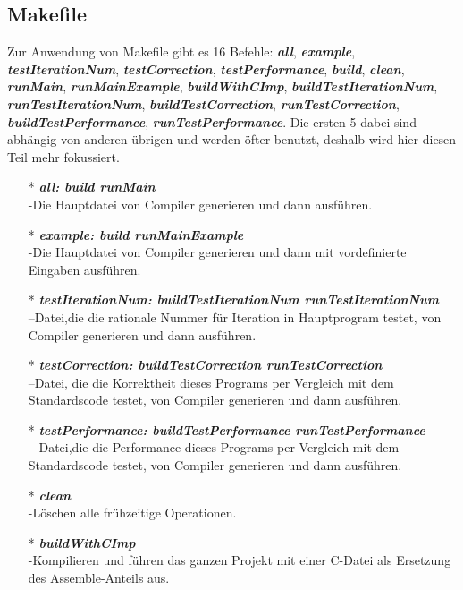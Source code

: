 \documentclass[course=erap]{aspdoc}
\begin{document}
\subsection{Makefile}
Zur Anwendung von Makefile gibt es 16 Befehle: \textbf{\emph{all}}, \textbf{\emph{example}}, \textbf{\emph{testIterationNum}}, \textbf{\emph{testCorrection}}, \textbf{\emph{testPerformance}}, \textbf{\emph{build}}, \textbf{\emph{clean}}, \textbf{\emph{runMain}}, \textbf{\emph{runMainExample}}, \textbf{\emph{buildWithCImp}}, \textbf{\emph{buildTestIterationNum}}, \textbf{\emph{runTestIterationNum}}, \textbf{\emph{buildTestCorrection}}, \textbf{\emph{runTestCorrection}}, \textbf{\emph{buildTestPerformance}}, \textbf{\emph{runTestPerformance}}. Die ersten 5 dabei sind abhängig von anderen übrigen und werden öfter benutzt, deshalb wird hier diesen Teil mehr fokussiert.
\begin{itemize}
\item[*]\textbf{\emph{all: build runMain}}
\\-Die Hauptdatei von Compiler generieren und dann ausführen.
\item[*]\emph{\textbf{example: build runMainExample }}
\\-Die Hauptdatei von Compiler generieren und dann mit vordefinierte Eingaben ausführen.
\item[*]\textbf{\emph{testIterationNum: buildTestIterationNum runTestIterationNum}}
\\–Datei,die die rationale Nummer für Iteration in Hauptprogram testet, von Compiler generieren und dann ausführen.
\item[*]\emph{\textbf{testCorrection: buildTestCorrection runTestCorrection }}
\\–Datei, die die Korrektheit dieses Programs per Vergleich mit dem Standardscode testet, von Compiler generieren und dann ausführen.
\item[*]\textbf{\emph{testPerformance: buildTestPerformance runTestPerformance }}
\\– Datei,die die Performance dieses Programs per Vergleich mit dem Standardscode testet, von Compiler generieren und dann ausführen.	
\item[*]\emph{\textbf{clean}}
\\-Löschen alle frühzeitige Operationen.
\item[*]\textbf{\emph{buildWithCImp}}
\\-Kompilieren und führen das ganzen Projekt mit einer C-Datei als Ersetzung des Assemble-Anteils aus.
\end{itemize}
\end{document}

